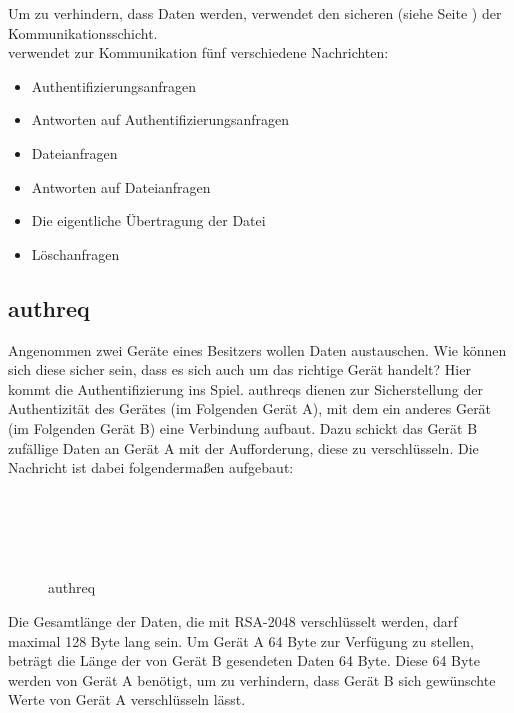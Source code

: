 Um zu verhindern, dass Daten werden, verwendet \sblit den sicheren  (siehe Seite \pageref{Applicationchannel}) der Kommunikationsschicht.\\
\sblitg verwendet zur Kommunikation fünf verschiedene Nachrichten:
\begin{itemize}
	\item Authentifizierungsanfragen
	\item Antworten auf Authentifizierungsanfragen
	\item Dateianfragen
	\item Antworten auf Dateianfragen
	\item Die eigentliche Übertragung der Datei
	\item Löschanfragen
\end{itemize}
\subsection{\gls{authreq}}
Angenommen zwei Geräte eines Besitzers wollen Daten austauschen. Wie können sich diese sicher sein, dass es sich auch um das richtige Gerät handelt? Hier kommt die Authentifizierung ins Spiel. \gls{authreq}s dienen zur Sicherstellung der Authentizität des Gerätes (im Folgenden Gerät A), mit dem ein anderes Gerät (im Folgenden Gerät B) eine Verbindung aufbaut. Dazu schickt das Gerät B zufällige Daten an Gerät A mit der Aufforderung, diese zu verschlüsseln. Die Nachricht ist dabei folgendermaßen aufgebaut:
\begin{figure}[H]
\begin{centering}

\begin{bytefield}[bitwidth=3em]{8}
	\\
	 \\
	
	\begin{rightwordgroup}{\isprotomsgtype}
	\end{rightwordgroup} \\
	
	\begin{rightwordgroup}{\isprotomsgdata}
	\end{rightwordgroup}
	
\end{bytefield}

\par\end{centering}
\protect\caption{\gls{authreq}}
\end{figure}
Die Gesamtlänge der Daten, die mit RSA-2048 verschlüsselt werden, darf maximal 128 Byte lang sein. Um Gerät A 64 Byte zur Verfügung zu stellen, beträgt die Länge der von Gerät B gesendeten Daten 64 Byte. Diese 64 Byte werden von Gerät A benötigt, um zu verhindern, dass Gerät B sich gewünschte Werte von Gerät A verschlüsseln lässt.

